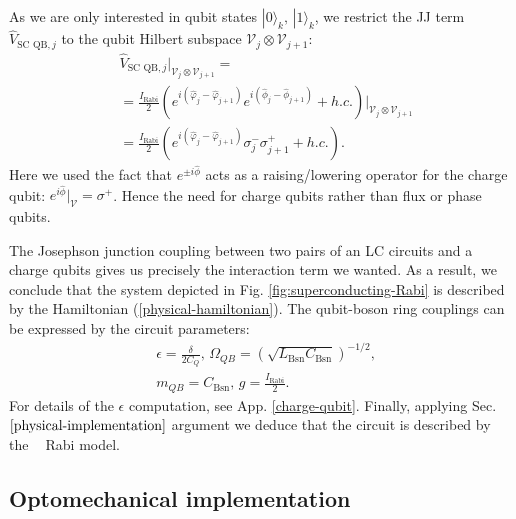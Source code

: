 \documentclass[reprint, aps, prx, amsmath, amssymb, longbibliography, superscriptaddress]{revtex4-2}
\DeclareMathOperator{\Zthree}{\mathbb{Z}_3}
\begin{document}
As we are only interested in qubit states $|0\rangle_k,\, |1\rangle_k$, we restrict the JJ term $\hat V_{\text{SC QB},j}$ to the qubit Hilbert subspace $\mathcal{V}_j\otimes \mathcal{V}_{j+1}$:
\begin{equation}
\begin{aligned}
    &\hat V_{\text{SC QB},j} \bigg |_{\mathcal{V}_j\otimes \mathcal{V}_{j+1}} = \\
    &=\frac{I_{\text{Rabi}}}{2}\left(e^{i(\hat\varphi_j - \hat\varphi_{j+1})} e^{i(\hat\phi_j - \hat\phi_{j+1})} + h.c. \right) \bigg|_{\mathcal{V}_j\otimes \mathcal{V}_{j+1}} \\
    &=\frac{I_{\text{Rabi}}}{2}\left(e^{i(\hat\varphi_j - \hat\varphi_{j+1})} \sigma_j^- \sigma_{j+1}^+ + h.c. \right).
\end{aligned}
\end{equation}
Here we used the fact that $e^{\pm i\hat\phi}$ acts as a raising/lowering operator for the charge qubit: $e^{i\hat\phi}|_{\mathcal{V}} = \sigma^+$. Hence the need for charge qubits rather than flux or phase qubits.

The Josephson junction coupling between two pairs of an LC circuits and a charge qubits gives us precisely the interaction term we wanted. As a result, we conclude that the system depicted in Fig. \ref{fig:superconducting-Rabi} is described by the Hamiltonian (\ref{physical-hamiltonian}).  The qubit-boson ring couplings can be expressed by the circuit parameters:
\begin{equation}
\begin{aligned}
    &\epsilon = \frac{\delta}{2 C_Q},\,
    \Omega_{QB} = \left(\sqrt{L_{\text{Bsn}}C_{\text{Bsn}}}\right)^{-1/2}, \\
    &m_{QB} = C_{\text{Bsn}}, \, g = \frac{I_{\text{Rabi}}}{2}.
\end{aligned}
\end{equation}
For details of the $\epsilon$ computation, see App. \ref{charge-qubit}. Finally, applying Sec. $\ref{physical-implementation}$ argument we deduce that the circuit is described by the $\Zthree$ Rabi model.


\subsection{Optomechanical implementation}
\label{optomechanical-implementation}
\end{document}
